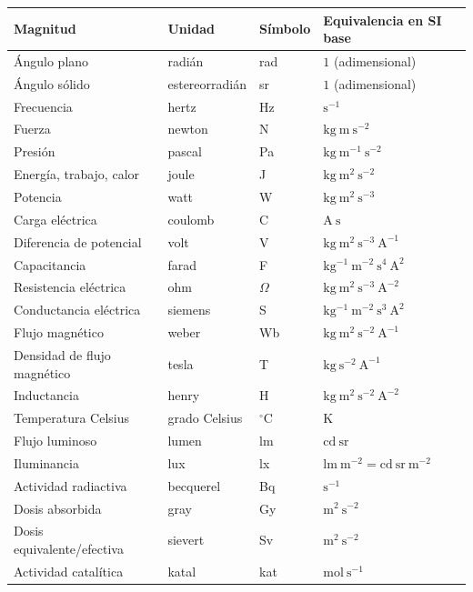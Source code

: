 \documentclass[11pt,a4paper]{article}
\begin{document}
\begin{tabularx}{\linewidth}{>{\raggedright\arraybackslash}X>{\raggedright\arraybackslash}X>{\raggedright\arraybackslash}X>{\raggedright\arraybackslash}X}
\hline
Magnitud & Unidad & Símbolo & Equivalencia en SI base \\
\hline
Ángulo plano & radián & rad & $1$ (adimensional) \\
\hline
Ángulo sólido & estereorradián & sr & $1$ (adimensional) \\
\hline
Frecuencia & hertz & Hz & $\mathrm{s^{-1}}$ \\
\hline
Fuerza & newton & N & $\mathrm{kg\ m\ s^{-2}}$ \\
\hline
Presión & pascal & Pa & $\mathrm{kg\ m^{-1}\ s^{-2}}$ \\
\hline
Energía, trabajo, calor & joule & J & $\mathrm{kg\ m^2\ s^{-2}}$ \\
\hline
Potencia & watt & W & $\mathrm{kg\ m^2\ s^{-3}}$ \\
\hline
Carga eléctrica & coulomb & C & $\mathrm{A\ s}$ \\
\hline
Diferencia de potencial & volt & V & $\mathrm{kg\ m^2\ s^{-3}\ A^{-1}}$ \\
\hline
Capacitancia & farad & F & $\mathrm{kg^{-1}\ m^{-2}\ s^4\ A^2}$ \\
\hline
Resistencia eléctrica & ohm & $\Omega$ & $\mathrm{kg\ m^2\ s^{-3}\ A^{-2}}$ \\
\hline
Conductancia eléctrica & siemens & S & $\mathrm{kg^{-1}\ m^{-2}\ s^3\ A^2}$ \\
\hline
Flujo magnético & weber & Wb & $\mathrm{kg\ m^2\ s^{-2}\ A^{-1}}$ \\
\hline
Densidad de flujo magnético & tesla & T & $\mathrm{kg\ s^{-2}\ A^{-1}}$ \\
\hline
Inductancia & henry & H & $\mathrm{kg\ m^2\ s^{-2}\ A^{-2}}$ \\
\hline
Temperatura Celsius & grado Celsius & $^\circ\mathrm{C}$ & $\mathrm{K}$ \\
\hline
Flujo luminoso & lumen & lm & $\mathrm{cd\ sr}$ \\
\hline
Iluminancia & lux & lx & $\mathrm{lm\ m^{-2}} = \mathrm{cd\ sr\ m^{-2}}$ \\
\hline
Actividad radiactiva & becquerel & Bq & $\mathrm{s^{-1}}$ \\
\hline
Dosis absorbida & gray & Gy & $\mathrm{m^2\ s^{-2}}$ \\
\hline
Dosis equivalente/efectiva & sievert & Sv & $\mathrm{m^2\ s^{-2}}$ \\
\hline
Actividad catalítica & katal & kat & $\mathrm{mol\ s^{-1}}$ \\
\hline
\end{tabularx}
\normalsize
\end{document}
